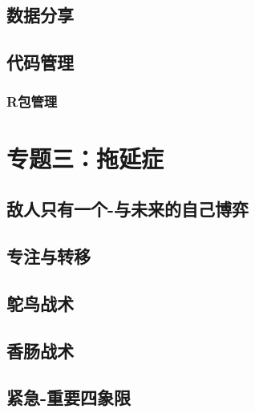 \documentclass[]{book}
\begin{document}
\section{数据分享}

\section{代码管理}

\subsection{R包管理}\label{r}

\chapter{专题三：拖延症}

\section{敌人只有一个-与未来的自己博弈}\label{-}

\section{专注与转移}

\section{鸵鸟战术}

\section{香肠战术}

\section{紧急-重要四象限}\label{-}


\end{document}
